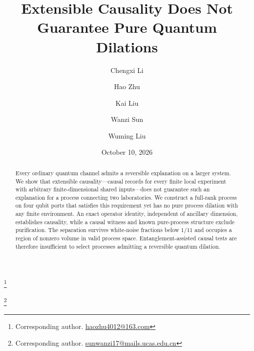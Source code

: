 \documentclass[aps,prl,reprint,superscriptaddress,longbibliography,bibnotes,floatfix]{revtex4-2}
\begin{document}
\title{Extensible Causality Does Not Guarantee Pure Quantum Dilations}
\author{Chengxi Li}
\author{Hao Zhu}
\thanks{Corresponding author. \href{mailto:haozhu4012@163.com}{haozhu4012@163.com}}
\author{Kai Liu}
\author{Wanzi Sun}
\thanks{Corresponding author. \href{mailto:sunwanzi17@mails.ucas.edu.cn}{sunwanzi17@mails.ucas.edu.cn}}
\author{Wuming Liu}
\date{October 10, 2026}
\begin{abstract}
Every ordinary quantum channel admits a reversible explanation on a larger system. We show that extensible causality---causal records for every finite local experiment with arbitrary finite-dimensional shared inputs---does not guarantee such an explanation for a process connecting two laboratories. We construct a full-rank process on four qubit ports that satisfies this requirement yet has no pure process dilation with any finite environment. An exact operator identity, independent of ancillary dimension, establishes causality, while a causal witness and known pure-process structure exclude purification. The separation survives white-noise fractions below $1/11$ and occupies a region of nonzero volume in valid process space. Entanglement-assisted causal tests are therefore insufficient to select processes admitting a reversible quantum dilation.
\end{abstract}
\maketitle
\end{document}
